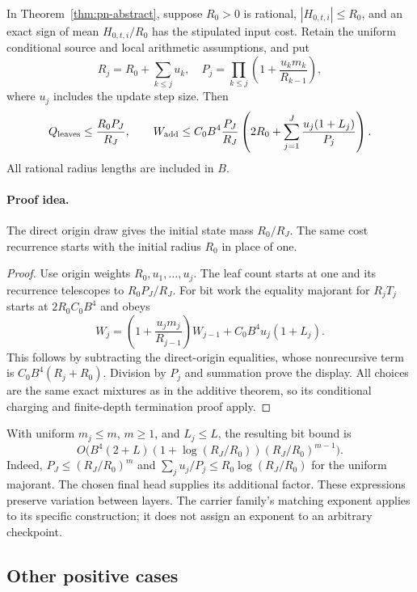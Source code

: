 \begin{corollary}
\label{cor:checkpoint-initial-radius}
In Theorem~\ref{thm:pn-abstract}, suppose $R_0>0$ is rational,
$|H_{0,t,i}|\le R_0$, and an exact sign of mean $H_{0,t,i}/R_0$
has the stipulated input cost. Retain the uniform conditional
source and local arithmetic assumptions, and put
\[
 R_j=R_0+\sum_{k\le j}u_k,\quad
 P_j=\prod_{k\le j}\left(1+\frac{u_km_k}{R_{k-1}}\right),
\]
where $u_j$ includes the update step size. Then
\[
 Q_{\rm leaves}\le\frac{R_0P_J}{R_J},\qquad
 W_{\rm add}\le C_0B^4\frac{P_J}{R_J}
  \left(2R_0+\sum_{j=1}^J\frac{u_j(1+L_j)}{P_j}\right).
\]
All rational radius lengths are included in $B$.
\end{corollary}

\paragraph{Proof idea.}
The direct origin draw gives the initial state mass $R_0/R_J$.
The same cost recurrence starts with the initial radius $R_0$
in place of one.

\begin{proof}
Use origin weights $R_0,u_1,\ldots,u_j$.
The leaf count starts at one and its recurrence telescopes to
$R_0P_J/R_J$. For bit work the equality majorant for $R_jT_j$
starts at $2R_0C_0B^4$ and obeys
\[
 W_j=\left(1+\frac{u_jm_j}{R_{j-1}}\right)W_{j-1}
         +C_0B^4u_j(1+L_j).
\]
This follows by subtracting the direct-origin equalities, whose
nonrecursive term is $C_0B^4(R_j+R_0)$.
Division by $P_j$ and summation prove the display. All choices
are the same exact mixtures as in the additive theorem, so its
conditional charging and finite-depth termination proof apply.
\end{proof}

With uniform $m_j\le m$, $m\ge1$, and $L_j\le L$, the resulting
bit bound is
\[
 O\bigl(B^4(2+L)(1+\log(R_J/R_0))(R_J/R_0)^{m-1}\bigr).
\]
Indeed, $P_J\le(R_J/R_0)^m$ and
$\sum_j u_j/P_j\le R_0\log(R_J/R_0)$ for the uniform
majorant. The chosen final head supplies its additional factor. These
expressions preserve variation between layers. The carrier
family's matching exponent applies to its specific construction;
it does not assign an exponent to an arbitrary checkpoint.

\subsection{Other positive cases}

